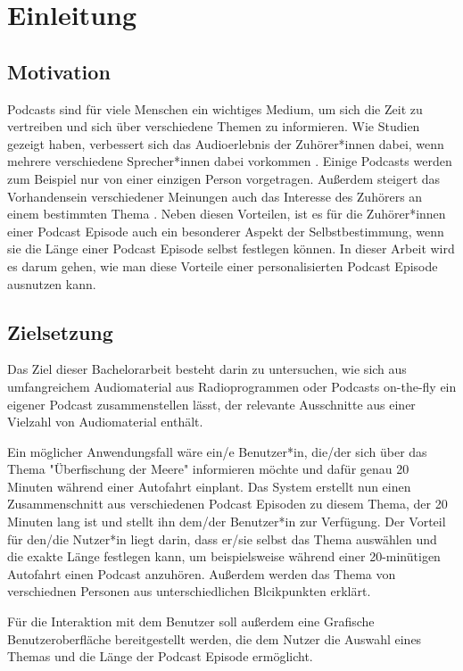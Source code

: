 \chapter{Einleitung}\label{ch:intro}

\section{Motivation}

Podcasts sind für viele Menschen ein wichtiges Medium, um sich die Zeit zu vertreiben und sich über verschiedene Themen zu informieren. 
Wie Studien gezeigt haben, verbessert sich das Audioerlebnis der Zuhörer*innen dabei, wenn mehrere verschiedene Sprecher*innen dabei vorkommen \cite{kang2012}. 
Einige Podcasts werden zum Beispiel nur von einer einzigen Person vorgetragen.
Außerdem steigert das Vorhandensein verschiedener Meinungen auch das Interesse des Zuhörers an einem bestimmten Thema \cite{phillips2014}.
Neben diesen Vorteilen, ist es für die Zuhörer*innen einer Podcast Episode auch ein besonderer Aspekt der Selbstbestimmung, wenn sie die Länge einer Podcast Episode selbst festlegen können.
In dieser Arbeit wird es darum gehen, wie man diese Vorteile einer personalisierten Podcast Episode ausnutzen kann.


\section{Zielsetzung}


Das Ziel dieser Bachelorarbeit besteht darin zu untersuchen, wie sich aus umfangreichem Audiomaterial aus Radioprogrammen oder Podcasts on-the-fly ein eigener Podcast zusammenstellen lässt, der relevante Ausschnitte aus einer Vielzahl von Audiomaterial enthält.

Ein möglicher Anwendungsfall wäre ein/e Benutzer*in, die/der sich über das Thema "Überfischung der Meere" informieren möchte und dafür genau 20 Minuten während einer Autofahrt einplant. 
Das System erstellt nun einen Zusammenschnitt aus verschiedenen Podcast Episoden zu diesem Thema, der 20 Minuten lang ist und stellt ihn dem/der Benutzer*in zur Verfügung. 
Der Vorteil für den/die Nutzer*in liegt darin, dass er/sie selbst das Thema auswählen und die exakte Länge festlegen kann, um beispielsweise während einer 20-minütigen Autofahrt einen Podcast anzuhören. 
Außerdem werden das Thema von verschiednen Personen aus unterschiedlichen Blcikpunkten erklärt. 

Für die Interaktion mit dem Benutzer soll außerdem eine Grafische Benutzeroberfläche bereitgestellt werden, die dem Nutzer die Auswahl eines Themas und die Länge der Podcast  Episode ermöglicht.

